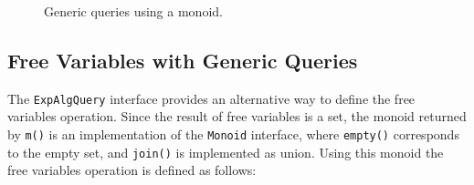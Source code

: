 \begin{figure}[tb]
\vspace{-.1in}
\caption{Generic queries using a monoid.}
\label{generic_query}
\end{figure}

\begin{comment}
And now we find everything goes in an easier way: we don't care about
what kind of query it is any more during the traversal. Despite
whether it asks for all the names of free variables or a printer
showing the hierarchy of an expression, at first we can simply
override the method \lstinline{m()}, which provides an instance of
\lstinline{Monoid}, in the return statement. As the next step, we only
need to override a few other methods to meet the requirements. This is
the progress, once we have such a template dealing with the traversal,
all query algebras can be addressed in a more concise way, which is
called the \textit{generic query algebra}.
\end{comment}

\subsection{Free Variables with Generic Queries}\label{subsec:solvingfreevars}


The \lstinline{ExpAlgQuery} interface provides an alternative way to
define the free variables operation.
Since the result of free variables is a set, the monoid returned by \lstinline{m()} is an implementation of the \lstinline{Monoid} interface, where \lstinline{empty()} corresponds to the empty set, and \lstinline{join()} is implemented as union.
Using this monoid
the free variables operation is defined as follows:



